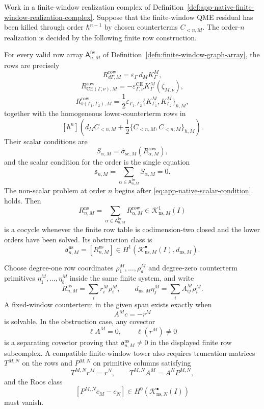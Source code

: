 \begin{thm}
\label{thm:app-constructive-nonscalar-costello-qme-realization}
  Work in a finite-window realization complex of
  Definition~\ref{def:app-native-finite-window-realization-complex}.
  Suppose that the finite-window QME residual has been killed through
  order \(\hbar^{n-1}\) by chosen counterterms \(C_{<n,M}\).  The
  order-\(n\) realization is decided by
  the following finite row construction.

  For every valid row array
  \(\mathsf A^{\mathrm{fw}}_{n,M}\) of
  Definition~\ref{defn:finite-window-graph-array}, the rows are precisely
  \[
    R^{\mathrm{row}}_{d\Gamma,M}
      =
    \varepsilon_\Gamma\,d_M K^M_\Gamma,
  \]
  \[
    R^{\mathrm{row}}_{\mathrm{CE}(\Gamma,\nu),M}
      =
    -\varepsilon^{\mathrm{CE}}_{\Gamma,\nu}
      K^M_\Gamma(\zeta_{M,\nu}),
  \]
  \[
    R^{\mathrm{row}}_{b(\Gamma_1,\Gamma_2),M}
      =
    \frac12\varepsilon_{\Gamma_1,\Gamma_2}
      \{K^M_{\Gamma_1},K^M_{\Gamma_2}\}_{\hbar,M},
  \]
  together with the homogeneous lower-counterterm rows in
  \[
    [\hbar^n]\left(
      d_M C_{<n,M}
      +\frac12\{C_{<n,M},C_{<n,M}\}_{\hbar,M}
    \right).
  \]
  Their scalar conditions are
  \[
    S_{\alpha,M}
      =
    \widehat\sigma_{\mathrm{sc},M}
      (R^{\mathrm{row}}_{\alpha,M}),
  \]
  and the scalar condition for the order is the single equation
  \[
    \mathfrak s_{n,M}
      =
    \sum_{\alpha\in\mathsf A^{\mathrm{fw}}_{n,M}}S_{\alpha,M}=0.
    \label{eq:app-native-scalar-condition}
  \]
  The non-scalar problem at order \(n\) begins after
  \eqref{eq:app-native-scalar-condition} holds.  Then
  \[
    R^{\mathrm{ns}}_{n,M}
      =
    \sum_{\alpha\in\mathsf A^{\mathrm{fw}}_{n,M}}
      R^{\mathrm{row}}_{\alpha,M}
      \in \mathcal K^1_{\mathrm{ns},M}(I)
  \]
  is a cocycle whenever the finite row table is codimension-two closed and
  the lower orders have been solved.  Its obstruction class is
  \[
    \mathfrak o^{\mathrm{ns}}_{n,M}
      =
    [R^{\mathrm{ns}}_{n,M}]
      \in
    H^1(\mathcal K^\bullet_{\mathrm{ns},M}(I),d_{\mathrm{ns},M}).
  \]

  Choose degree-one row coordinates
  \(\rho^M_1,\ldots,\rho^M_a\) and degree-zero counterterm primitives
  \(\eta^M_1,\ldots,\eta^M_b\) inside the same finite system, and write
  \[
    R^{\mathrm{ns}}_{n,M}=\sum_i r^M_i\rho^M_i,
    \qquad
    d_{\mathrm{ns},M}\eta^M_j=\sum_i A^M_{ij}\rho^M_i .
  \]
  A fixed-window counterterm in the given span exists exactly when
  \[
    A^M c=-r^M
    \label{eq:app-native-counterterm-linear-system}
  \]
  is solvable.  In the obstruction case, any covector
  \[
    \ell A^M=0,\qquad \ell(r^M)\neq0
  \]
  is a separating covector proving that
  \(\mathfrak o^{\mathrm{ns}}_{n,M}\neq0\) in the displayed finite row
  subcomplex.  A compatible finite-window tower also requires truncation
  matrices \(T^{M,N}\) on the rows and \(P^{M,N}\) on primitive columns
  satisfying
  \[
    T^{M,N}r^M=r^N,\qquad
    T^{M,N}A^M=A^N P^{M,N},
  \]
  and the Roos class
  \[
    [P^{M,N}c_M-c_N]\in
    H^0(\mathcal K^\bullet_{\mathrm{ns},N}(I))
  \]
  must vanish.


\end{thm}
